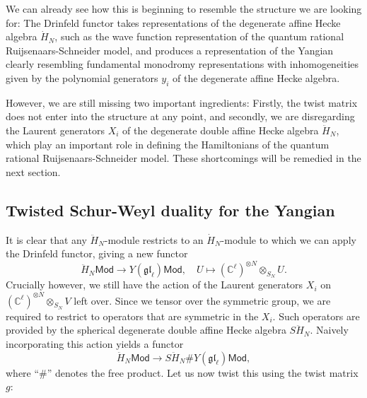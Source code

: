 \documentclass[11pt]{report}
\newtheorem{prop}[theorem]{Proposition}
\theoremstyle{definition}
\theoremstyle{remark}
\theoremstyle{remark}
\newcommand{\C}{\mathbb{C}}
\begin{document}
%

We can already see how this is beginning to resemble the structure we are looking for: The Drinfeld functor takes representations of the degenerate affine Hecke algebra $\dot H_N$, such as the wave function representation of the quantum rational Ruijsenaars-Schneider model, and produces a representation of the Yangian clearly resembling fundamental monodromy representations with inhomogeneities given by the polynomial generators $y_i$ of the degenerate affine Hecke algebra.

However, we are still missing two important ingredients: Firstly, the twist matrix does not enter into the structure at any point, and secondly, we are disregarding the Laurent generators $X_i$ of the degenerate double affine Hecke algebra $\ddot H_N$, which play an important role in defining the Hamiltonians of the quantum rational Ruijsenaars-Schneider model. These shortcomings will be remedied in the next section.

\subsection{Twisted Schur-Weyl duality for the Yangian}

It is clear that any $\ddot H_N$-module restricts to an $\dot H_N$-module to which we can apply the Drinfeld functor, giving a new functor
\begin{equation*}
\ddot H_N\mathsf{Mod} \to Y(\mathfrak{gl}_\ell)\mathsf{Mod}, \quad U \mapsto (\C^\ell)^{\otimes N} \otimes_{S_N} U.
\end{equation*}
Crucially however, we still have the action of the Laurent generators $X_i$ on $(\C^\ell)^{\otimes N} \otimes_{S_N} V$ left over. Since we tensor over the symmetric group, we are required to restrict to operators that are symmetric in the $X_i$. Such operators are provided by the spherical degenerate double affine Hecke algebra $S\ddot H_N$. Naively incorporating this action yields a functor
\begin{equation*}
\ddot H_N\mathsf{Mod} \to S\ddot H_N \# Y(\mathfrak{gl}_\ell)\mathsf{Mod},
\end{equation*}
where “$\#$” denotes the free product. Let us now twist this using the twist matrix $g$:
\end{document}
